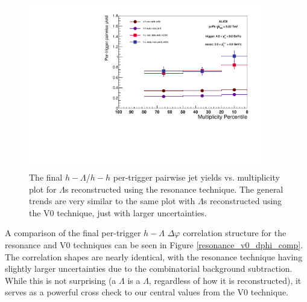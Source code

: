 \documentclass[ALICE,manyauthors]{ALICE_analysis_notes}
\begin{document}
\begin{itemize}
\begin{figure}[ht]
\centering
\includegraphics[width=4in]{figures/resonance_pairwise_plot_2_4.pdf}
\caption{The final $h-\Lambda$/$h-h$ per-trigger pairwise jet yields vs. multiplicity plot for $\Lambda$s reconstructed using the resonance technique. The general trends are very similar to the same plot with $\Lambda$s reconstructed using the V0 technique, just with larger uncertainties.}
\label{final_pairwise_yields_resonance}
\end{figure}

A comparison of the final per-trigger $h-\Lambda$ $\Delta\varphi$ correlation structure for the resonance and V0 techniques can be seen in Figure \ref{resonance_v0_dphi_comp}. The correlation shapes are nearly identical, with the resonance technique having slightly larger uncertainties due to the combinatorial background subtraction. While this is not surprising (a $\Lambda$ is a $\Lambda$, regardless of how it is reconstructed), it serves as a powerful cross check to our central values from the V0 technique.


\end{itemize}
\end{document}
